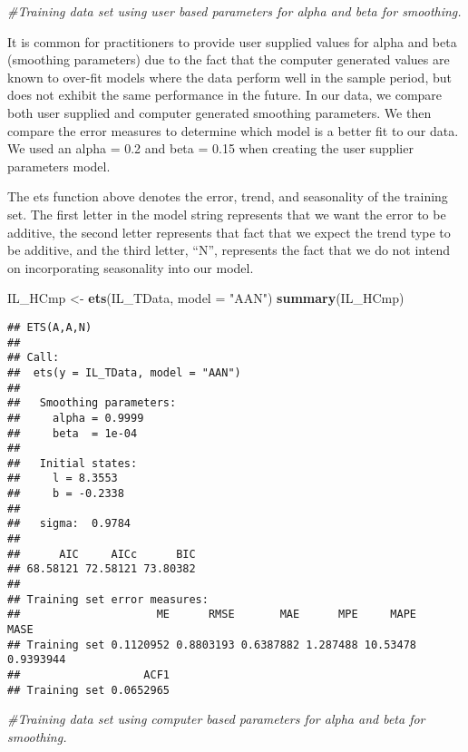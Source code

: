 \documentclass[
]{article}
\newenvironment{Shaded}{\begin{snugshade}}{\end{snugshade}}
\newcommand{\CommentTok}[1]{\textcolor[rgb]{0.56,0.35,0.01}{\textit{#1}}}
\newcommand{\DataTypeTok}[1]{\textcolor[rgb]{0.13,0.29,0.53}{#1}}
\newcommand{\KeywordTok}[1]{\textcolor[rgb]{0.13,0.29,0.53}{\textbf{#1}}}
\newcommand{\NormalTok}[1]{#1}
\newcommand{\StringTok}[1]{\textcolor[rgb]{0.31,0.60,0.02}{#1}}
\begin{document}
\begin{Shaded}
\begin{Highlighting}[]
\CommentTok{#Training data set using user based parameters for alpha and beta for smoothing.}
\end{Highlighting}
\end{Shaded}

It is common for practitioners to provide user supplied values for alpha
and beta (smoothing parameters) due to the fact that the computer
generated values are known to over-fit models where the data perform
well in the sample period, but does not exhibit the same performance in
the future. In our data, we compare both user supplied and computer
generated smoothing parameters. We then compare the error measures to
determine which model is a better fit to our data. We used an alpha =
0.2 and beta = 0.15 when creating the user supplier parameters model.

The ets function above denotes the error, trend, and seasonality of the
training set. The first letter in the model string represents that we
want the error to be additive, the second letter represents that fact
that we expect the trend type to be additive, and the third letter,
``N'', represents the fact that we do not intend on incorporating
seasonality into our model.

\begin{Shaded}
\begin{Highlighting}[]
\NormalTok{IL_HCmp <-}\StringTok{ }\KeywordTok{ets}\NormalTok{(IL_TData, }\DataTypeTok{model =} \StringTok{"AAN"}\NormalTok{)}
\KeywordTok{summary}\NormalTok{(IL_HCmp)}
\end{Highlighting}
\end{Shaded}

\begin{verbatim}
## ETS(A,A,N) 
## 
## Call:
##  ets(y = IL_TData, model = "AAN") 
## 
##   Smoothing parameters:
##     alpha = 0.9999 
##     beta  = 1e-04 
## 
##   Initial states:
##     l = 8.3553 
##     b = -0.2338 
## 
##   sigma:  0.9784
## 
##      AIC     AICc      BIC 
## 68.58121 72.58121 73.80382 
## 
## Training set error measures:
##                     ME      RMSE       MAE      MPE     MAPE      MASE
## Training set 0.1120952 0.8803193 0.6387882 1.287488 10.53478 0.9393944
##                   ACF1
## Training set 0.0652965
\end{verbatim}

\begin{Shaded}
\begin{Highlighting}[]
\CommentTok{#Training data set using computer based parameters for alpha and beta for smoothing.}
\end{Highlighting}
\end{Shaded}
\end{document}
